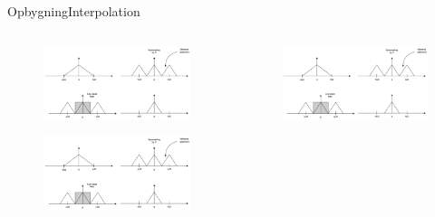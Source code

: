 \begin{frame}{Opbygning}{Interpolation}
\begin{columns}
		\begin{column}{0.3\textwidth}
			\begin{figure}
				\centering
				\includegraphics[width=\textwidth]{upsampling1}
			\end{figure}
			\begin{figure}
				\centering
				\includegraphics[width=\textwidth]{upsampling3}
			\end{figure}									
		\end{column}
		\begin{column}{0.3\textwidth}
			\begin{figure}
				\centering
				\includegraphics[width=\textwidth]{upsampling2}

\end{figure}
\end{column}
\end{columns}
\end{frame}
